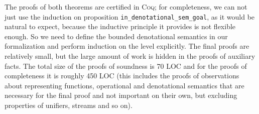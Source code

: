 The proofs of both theorems are certified in \textsc{Coq}; for completeness, we can not just use the induction on proposition \lstinline|in_denotational_sem_goal|, as it would be natural to expect,
because the inductive principle it provides is not flexible enough. So we need to define the bounded denotational semantics in our formalization and perform
induction on the level explicitly. The final proofs are relatively small, but the large amount of work is hidden in the proofs of auxiliary facts. { \color{red} The total size of the proofs of soundness is 70 LOC and for the proofs of
  completeness it is roughly 450 LOC (this includes the proofs of observations about representing functions, operational and denotational semantics that are necessary for the final proof
  and not important on their own, but excluding properties of unifiers, streams and so on). }

\begin{comment}
\begin{lstlisting}[language=Coq,morekeywords={where,at,level}]
  Reserved Notation "[| n | g , f |]" (at level 0).
  Inductive in_denotational_sem_lev_goal :
    nat -> goal -> repr_fun -> Prop :=
    ...
  | dslgInvoke : forall l r t f,
      [| l  | proj1_sig (Prog r) t , f |] ->
      [| S l | Invoke r t , f |]
  where "[| n | g , f |]" :=
    (in_denotational_sem_lev_goal n g f).
\end{lstlisting}

Recall that the environment ``\lstinline[language=Coq]|Prog|'' maps every relational symbol to the definition of relation,
which is a pair of a function from terms to goals and a proof that it is closed and consistent.
So ``\lstinline[language=Coq]|(proj1_sig (Prog r) t)|'' here simply takes the body of the corresponding relation.

The lemma relating bounded and unbounded denotational semantics in \textsc{Coq} looks as follows:

\begin{lstlisting}[language=Coq] 
  Lemma in_denotational_sem_some_lev:
    forall (g : goal) (f : repr_fun),
      [| g , f |] -> exists l, [| l | g , f |].
\end{lstlisting}

The statements of the theorems are as follows:

\begin{lstlisting}[language=Coq]]
  Theorem search_correctness:
    forall (g : goal) (k : nat) (f : repr_fun) (t : trace),
      closed_goal_in_context (first_nats k) g) ->
      op_sem (State (Leaf g empty_subst k)) t) ->
      {| t , f |} ->
      [| g , f |].
  Theorem search_completeness:
    forall (g : goal) (k : nat) (f : repr_fun) (t : trace),
      consistent_goal g ->
      closed_goal_in_context (first_nats k) g ->
      op_sem (State (Leaf g empty_subst k)) t ->
      [| g , f |] ->
      exists (f' : repr_fun),
        {| t , f' |} /\
        forall (x : var), In x (first_nats k) -> f x = f' x.
\end{lstlisting}
\end{comment}
